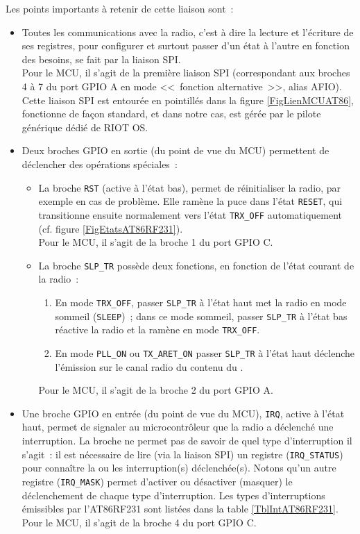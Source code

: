 Les points importants à retenir de cette liaison sont~:
\begin{itemize}

\item Toutes les communications avec la radio, c'est à dire la lecture
et l'écriture de ses registres, pour configurer et surtout passer d'un
état à l'autre en fonction des besoins, se fait par la liaison SPI.\\
Pour le MCU, il s'agit de la première liaison SPI (correspondant aux broches
4 à 7 du port GPIO A en mode <<~fonction alternative~>>, alias AFIO).\\
Cette liaison SPI est entourée en pointillés dans la figure
\vref{FigLienMCUAT86}, fonctionne de façon standard, et dans notre cas,
est gérée par le pilote générique dédié de RIOT OS.

\item Deux broches GPIO en sortie (du point de vue du MCU) permettent
de déclencher des opérations spéciales~:
  \begin{itemize}
  \item La broche \texttt{RST} (active à l'état bas), permet de réinitialiser
        la radio, par exemple en cas de problème. Elle ramène la puce
        dans l'état \texttt{RESET}, qui transitionne ensuite normalement
        vers l'état \texttt{TRX\_OFF} automatiquement (cf. figure
        \vref{FigEtatsAT86RF231}).\\
        Pour le MCU, il s'agit de la broche 1 du port GPIO C.
  \item La broche \texttt{SLP\_TR} possède deux fonctions, en fonction de
        l'état courant de la radio~:
    \begin{enumerate}
    \item En mode \texttt{TRX\_OFF}, passer \texttt{SLP\_TR} à l'état haut
          met la radio en mode sommeil (\texttt{SLEEP})~; dans ce mode
          sommeil, passer \texttt{SLP\_TR} à l'état bas réactive la radio
          et la ramène en mode \texttt{TRX\_OFF}.
    \item En mode \texttt{PLL\_ON} ou \texttt{TX\_ARET\_ON} passer
          \texttt{SLP\_TR} à l'état haut déclenche l'émission sur le canal
          radio du contenu du .
    \end{enumerate}
        Pour le MCU, il s'agit de la broche 2 du port GPIO A.
  \end{itemize}

\item Une broche GPIO en entrée (du point de vue du MCU), \texttt{IRQ},
active à l'état haut, permet de signaler au microcontrôleur que la radio
a déclenché une interruption. La broche ne permet pas de savoir de quel
type d'interruption il s'agit~: il est nécessaire de lire (via la liaison
SPI) un registre (\texttt{IRQ\_STATUS}) pour connaître la ou les
interruption(s) déclenchée(s). Notons qu'un autre registre
(\texttt{IRQ\_MASK}) permet d'activer ou désactiver (masquer) le
déclenchement de chaque type d'interruption. Les types d'interruptions
émissibles par l'AT86RF231 sont listées dans la table
\vref{TblIntAT86RF231}.\\
Pour le MCU, il s'agit de la broche 4 du port GPIO C.


\end{itemize}

